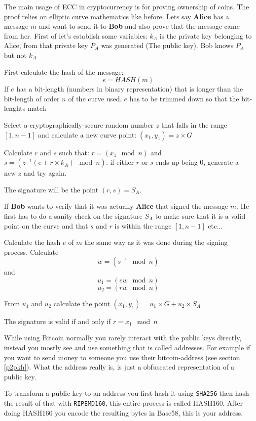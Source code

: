 The main usage of ECC in cryptocurrency is for proving ownership of coins. The proof relies 
on elliptic curve mathematics like before. Lets say \textbf{Alice} has a message $m$ and want 
to send it to \textbf{Bob} and also prove that the message came from her. First of let's 
establish some variables: $k_A$ is the private key belonging to Alice, from that private 
key $P_A$ was generated (The public key). Bob knows $P_A$ but not $k_A$ 

First calculate the hash of the message:
$$e=HASH(m)$$
If $e$ has a bit-length (numbers in binary representation) that is longer than the bit-length 
of order $n$ of the curve used. $e$ has to be trimmed down so that the bit-lenghts match

Select a cryptographically-secure random number $z$ that falls in the range $[1, n-1]$ and 
calculate a new curve point: $(x_1, y_1) = z \times G$

Calculate $r$ and $s$ such that: $r = (x_1 \mod n)$ and $s = (z^{-1} (e + r \times k_A) \mod n)$. 
if either $r$ or $s$ ends up being 0, generate a new $z$ and try again.

The signature will be the point $(r, s) = S_A$.

\label{signature_validation}
If \textbf{Bob} wants to verify that it was actually \textbf{Alice} that signed the message $m$. 
He first has to do a sanity check on the signature $S_A$ to make sure that it is a valid point on 
the curve and that $s$ and $r$ is within the range $[1, n-1]$ etc... 

Calculate the hash $e$ of $m$ the same way as it was done during the signing process. Calculate 
$$w=(s^{-1} \mod n)$$ and $$u_1 = (ew \mod n)$$ $$u_2 = (rw \mod n)$$

From $u_1$ and $u_2$ calculate the point $(x_1, y_1) = u_1 \times G + u_2 \times S_A$ 

The signature is valid if and only if $r = x_1 \mod n$

While using Bitcoin normally you rarely interact with the public keys directly, instead you mostly see  and use something that is called addresses. For example if you want to send money to someone you use their bitcoin-address (see section \ref{p2pkh}). What the address really is, is just a obfuscated representation of a public key.  

To transform a public key to an address you first hash it using \texttt{SHA256} then hash the result of that with \texttt{RIPEMD160}, this entire process is called HASH160. After doing HASH160 you encode the resulting bytes in Base58, this is your address. 

